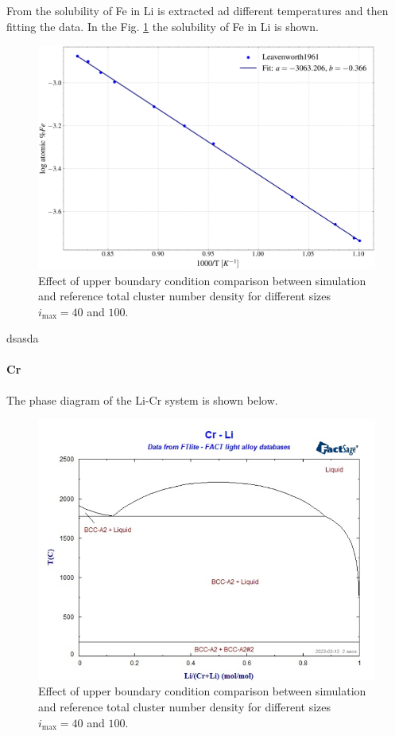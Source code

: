 From \cite{Leavenworth1961TheSO} the solubility of Fe in Li is extracted ad different temperatures and then fitting the data. In the Fig. \ref{fig:Fe_solubility} the solubility of Fe in Li is shown.
\begin{figure}[H]
    \centering
    \includegraphics[width=0.9\linewidth]{Fe_solubility.png}
    \caption{Effect of upper boundary condition comparison between simulation and reference total cluster number density for different sizes $i_{\text{max}} = 40$ and $100$.}
    \label{fig:Fe_solubility}
\end{figure}
dsasda


\paragraph{Cr}

The phase diagram of the Li-Cr system is shown below.
\begin{figure}[H]
    \centering
    \includegraphics[width=0.9\linewidth]{Li_Cr_phase_diagram.png}
    \caption{Effect of upper boundary condition comparison between simulation and reference total cluster number density for different sizes $i_{\text{max}} = 40$ and $100$.}
    \label{fig:cr_li_diagram}
\end{figure}

